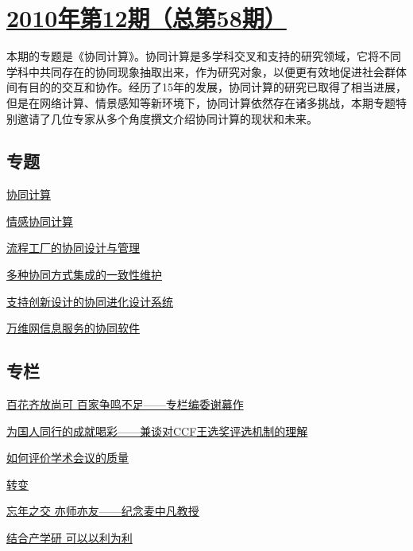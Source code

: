 \documentclass[a4paper]{article}
\begin{document}
\section{\href{http://history.ccf.org.cn/sites/ccf/jsjtbbd.jsp?contentId=2585984258060}{\textbf{2010年第12期（总第58期）}}}
本期的专题是《协同计算》。协同计算是多学科交叉和支持的研究领域，它将不同学科中共同存在的协同现象抽取出来，作为研究对象，以便更有效地促进社会群体间有目的的交互和协作。经历了15年的发展，协同计算的研究已取得了相当进展，但是在网络计算、情景感知等新环境下，协同计算依然存在诸多挑战，本期专题特别邀请了几位专家从多个角度撰文介绍协同计算的现状和未来。
\subsection{专题}
\href{http://history.ccf.org.cn/resources/1190201776262/2010/12/23/1.pdf}{协同计算}

\href{http://history.ccf.org.cn/resources/1190201776262/2010/12/23/2.pdf}{情感协同计算}

\href{http://history.ccf.org.cn/resources/1190201776262/2010/12/23/6.pdf}{流程工厂的协同设计与管理}

\href{http://history.ccf.org.cn/resources/1190201776262/2010/12/23/3.pdf}{多种协同方式集成的一致性维护}

\href{http://history.ccf.org.cn/resources/1190201776262/2010/12/23/5.pdf}{支持创新设计的协同进化设计系统}

\href{http://history.ccf.org.cn/resources/1190201776262/2010/12/23/4.pdf}{万维网信息服务的协同软件}

\subsection{专栏}
\href{http://history.ccf.org.cn/resources/1190201776262/2010/12/23/7.pdf}{百花齐放尚可 百家争鸣不足——专栏编委谢幕作}

\href{http://history.ccf.org.cn/resources/1190201776262/2010/12/23/8.pdf}{为国人同行的成就喝彩——兼谈对CCF王选奖评选机制的理解}

\href{http://history.ccf.org.cn/resources/1190201776262/2010/12/23/9.pdf}{如何评价学术会议的质量}

\href{http://history.ccf.org.cn/resources/1190201776262/2010/12/23/13.pdf}{转变}

\href{http://history.ccf.org.cn/resources/1190201776262/2010/12/23/10.pdf}{忘年之交 亦师亦友——纪念麦中凡教授}

\href{http://history.ccf.org.cn/resources/1190201776262/2010/12/23/12.pdf}{结合产学研 可以以利为利}
\end{document}
